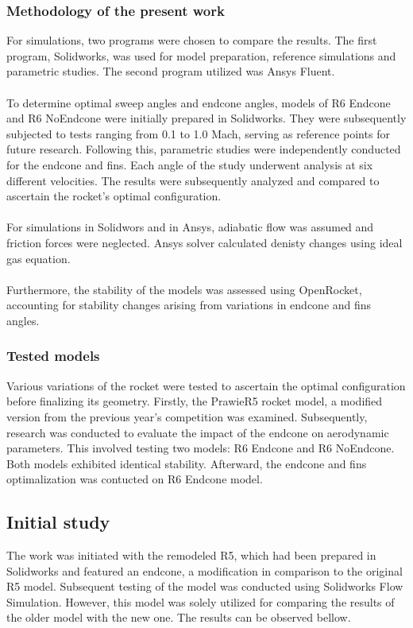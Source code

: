 \subsubsection{Methodology of the present work}
For simulations, two programs were chosen to compare the results. The first program, 
Solidworks, was used for model preparation, reference simulations and parametric studies. The second 
program utilized was Ansys Fluent.\\\\
To determine optimal sweep angles and endcone angles, models of R6 Endcone and R6 NoEndcone were 
initially prepared in Solidworks. They were subsequently subjected to tests ranging from 0.1 to 1.0 
Mach, serving as reference points for future research. Following this, parametric studies were 
independently conducted for the endcone and fins. Each angle of the study underwent analysis at 
six different velocities. The results were subsequently analyzed and compared to ascertain the 
rocket's optimal configuration.\\\\
For simulations in Solidwors and in Ansys, adiabatic flow was assumed and friction forces were
neglected. Ansys solver calculated denisty changes using ideal gas equation.\\\\
Furthermore, the stability of the models was assessed using OpenRocket, accounting for 
stability changes arising from variations in endcone and fins angles.



\subsubsection{Tested models}
Various variations of the rocket were tested to ascertain the optimal configuration before 
finalizing its geometry. Firstly, the PrawieR5 rocket model, a modified version from the previous year's competition 
was examined. Subsequently, research was conducted to evaluate the impact of the endcone on 
aerodynamic parameters. This involved testing two models: R6 Endcone and R6 NoEndcone. Both models exhibited identical stability. Afterward, the endcone and fins optimalization
was contucted on R6 Endcone model.


\newpage
\subsection{Initial study}
The work was initiated with the remodeled R5, which had been prepared in Solidworks 
and featured an endcone, a modification in comparison to the original R5 model. Subsequent 
testing of the model was conducted using Solidworks Flow Simulation. However, this model 
was solely utilized for comparing the results of the older model with the new one. The 
results can be observed bellow.



